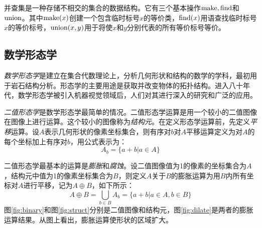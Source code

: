 并查集是一种存储不相交的集合的数据结构。它有三个基本操作$\operatorname{make},\operatorname{find}$和$\operatorname{union}$。其中$\operatorname{make}(x)$创建一个包含临时标号$x$的等价类，$\operatorname{find}(x)$用语查找临时标号$x$的等价标号，$\operatorname{union}(x,y)$用于将使$x$和$y$分别代表的所有等价标号等价。%

\subsection{数学形态学}\label{sec:morph}

\emph{数学形态学}是建立在集合代数理论上，分析几何形状和结构的数学的学科，最初用于岩石结构分析。形态学的主要用途是获取并改变物体的拓扑结构。进入八十年代，数学形态学被引入机器视觉领域后，人们对其进行深入的研究和广泛的应用。%

\emph{二值形态学}是数学形态学最简单的情况。二值形态学运算是用一个较小的二值图像在图像上进行运算。这个较小的图像称为\emph{结构元}。在定义形态学运算前，先定义\emph{平移}运算。设$A$表示几何形状的像素坐标集合，则有序对$b$对$A$平移运算定义为对$A$的每个坐标加上有序对$b$，用公式表示为：%
\begin{equation}
  \label{eq:shift}
  A_b=\{a+b|a\in A\}
\end{equation}

二值形态学最基本的运算是\emph{膨胀}和\emph{腐蚀}。设二值图像值为1的像素的坐标集合为$A$，结构元中值为1的像素坐标集合为$B$，则定义$A$关于$B$的膨胀运算为用$B$内所有坐标对$A$进行平移，记为$A\oplus B$，如下所示：
\begin{equation}
  \label{eq:dilate}
  A\oplus B=\bigcup_{b\in B}A_b=\{a+b|a\in A,b\in B\}
\end{equation}
图\ref{fig:binary}和图\ref{fig:struct}分别是二值图像和结构元，图\ref{fig:dilate}是两者的膨胀运算结果。从图上看出，膨胀运算使形状的区域扩大。

